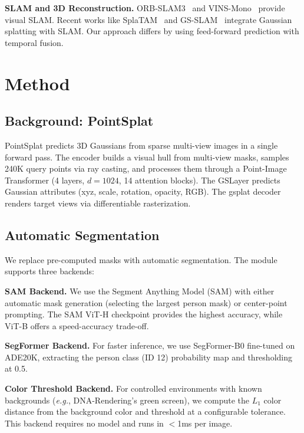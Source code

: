 \documentclass[10pt,twocolumn,letterpaper]{article}
\newcommand{\eg}{\textit{e.g.}}
\begin{document}
\textbf{SLAM and 3D Reconstruction.}
ORB-SLAM3~\cite{campos2021orb} and VINS-Mono~\cite{qin2018vins} provide
visual SLAM. Recent works like SplaTAM~\cite{keetha2024splatam} and
GS-SLAM~\cite{yan2024gs} integrate Gaussian splatting with SLAM. Our
approach differs by using feed-forward prediction with temporal fusion.

\section{Method}
\label{sec:method}

\subsection{Background: PointSplat}
\label{sec:background}

PointSplat predicts 3D Gaussians from sparse multi-view images in a single
forward pass. The encoder builds a visual hull from multi-view masks,
samples 240K query points via ray casting, and processes them through a
Point-Image Transformer (4 layers, $d=1024$, 14 attention blocks). The
GSLayer predicts Gaussian attributes (xyz, scale, rotation, opacity, RGB).
The gsplat decoder renders target views via differentiable rasterization.

\subsection{Automatic Segmentation}
\label{sec:segmentation}

We replace pre-computed masks with automatic segmentation. The module
supports three backends:

\textbf{SAM Backend.} We use the Segment Anything Model (SAM) with
either automatic mask generation (selecting the largest person mask) or
center-point prompting. The SAM ViT-H checkpoint provides the highest
accuracy, while ViT-B offers a speed-accuracy trade-off.

\textbf{SegFormer Backend.} For faster inference, we use SegFormer-B0
fine-tuned on ADE20K, extracting the person class (ID 12) probability
map and thresholding at 0.5.

\textbf{Color Threshold Backend.} For controlled environments with known
backgrounds (\eg, DNA-Rendering's green screen), we compute the $L_1$
color distance from the background color and threshold at a configurable
tolerance. This backend requires no model and runs in $<$1ms per image.
\end{document}
